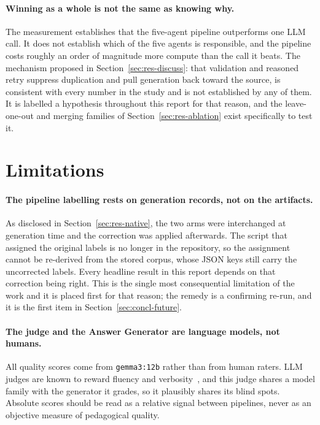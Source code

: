 \paragraph{Winning as a whole is not the same as knowing why.} The measurement
establishes that the five-agent pipeline outperforms one LLM call. It does not
establish which of the five agents is responsible, and the pipeline costs roughly an
order of magnitude more compute than the call it beats. The mechanism proposed in
Section~\ref{sec:res-discuss}: that validation and reasoned retry suppress
duplication and pull generation back toward the source, is consistent with every
number in the study and is not established by any of them. It is labelled a
hypothesis throughout this report for that reason, and the leave-one-out and merging
families of Section~\ref{sec:res-ablation} exist specifically to test it.

\section{Limitations}
\label{sec:concl-limits}

\paragraph{The pipeline labelling rests on generation records, not on the
artifacts.} As disclosed in Section~\ref{sec:res-native}, the two arms were
interchanged at generation time and the correction was applied afterwards. The
script that assigned the original labels is no longer in the repository, so the
assignment cannot be re-derived from the stored corpus, whose JSON keys still carry
the uncorrected labels. Every headline result in this report depends on that
correction being right. This is the single most consequential limitation of the work
and it is placed first for that reason; the remedy is a confirming re-run, and it is
the first item in Section~\ref{sec:concl-future}.

\paragraph{The judge and the Answer Generator are language models, not humans.} All
quality scores come from \texttt{gemma3:12b} rather than from human raters. LLM
judges are known to reward fluency and verbosity~\cite{zheng2023judging}, and this
judge shares a model family with the generator it grades, so it plausibly shares its
blind spots. Absolute scores should be read as a relative signal between pipelines,
never as an objective measure of pedagogical quality.

